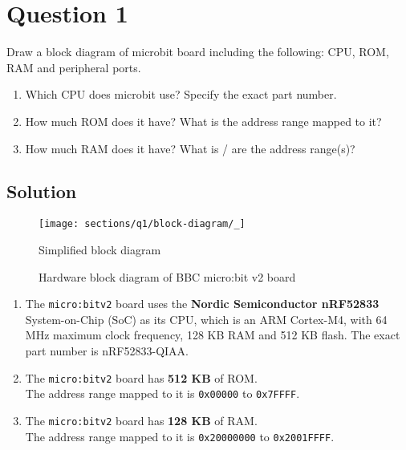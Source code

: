 \section*{Question 1}

Draw a block diagram of microbit board including the following: CPU, ROM, RAM and peripheral ports.

\begin{enumerate}[label = (\alph*)]
    \item Which CPU does microbit use? Specify the exact part number.
    \item How much ROM does it have? What is the address range mapped to it?
    \item How much RAM does it have? What is / are the address range(s)?
\end{enumerate}

\subsection*{Solution}

\begin{figure*}[htbp]
    \centering
    \texttt{[image: sections/q1/block-diagram/\_]}
    \caption{
        Simplified block diagram
    }\label{fig:simple-block-diagram}
\end{figure*}

\begin{figure*}[htbp]
    \centering
    
    \caption{
        Hardware block diagram of BBC micro:bit v2 board
    }\label{fig:block-diagram-microbit}
\end{figure*}

\newcommand{\hex}[1]{\texttt{#1}}
\begin{enumerate}[label = (\alph*)]
    \item The \texttt{micro:bit\;v2} board uses the \textbf{Nordic Semiconductor nRF52833} System-on-Chip (SoC) as its CPU, which is an ARM Cortex-M4, with 64 MHz maximum clock frequency, 128 KB RAM and 512 KB flash.
          The exact part number is nRF52833-QIAA.\@
    \item The \texttt{micro:bit\;v2} board has \textbf{512 KB} of ROM.\\
          The address range mapped to it is \hex{0x00000} to \hex{0x7FFFF}.
    \item The \texttt{micro:bit\;v2} board has \textbf{128 KB} of RAM.\\
          The address range mapped to it is \hex{0x20000000} to \hex{0x2001FFFF}.
\end{enumerate}
